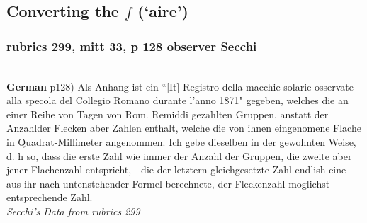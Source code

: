 \documentclass[12pt]{article}
\begin{document}
\subsection{Converting the $f$ (`aire')}\label{converting the `aire'}

\subsubsection{rubrics 299, mitt 33, p 128 observer Secchi}\label{rubrics 299, secchi}\\

\textbf{German}
p128) Als Anhang ist ein ``[It] Registro della macchie solarie osservate alla specola del Collegio Romano durante l'anno 1871" gegeben, welches die an einer Reihe von Tagen von Rom. Remiddi gezahlten Gruppen, anstatt der Anzahlder Flecken aber Zahlen enthalt, welche die von ihnen eingenomene Flache in Quadrat-Millimeter angenommen. Ich gebe dieselben in der gewohnten Weise, d. h so, dass die erste Zahl wie immer der Anzahl der Gruppen, die zweite aber jener Flachenzahl entspricht, - die der letztern gleichgesetzte Zahl endlish eine aus ihr nach untenstehender Formel berechnete, der Fleckenzahl moglichst entsprechende Zahl.\\

\textit{Secchi's Data from rubrics 299}\\
\end{document}
